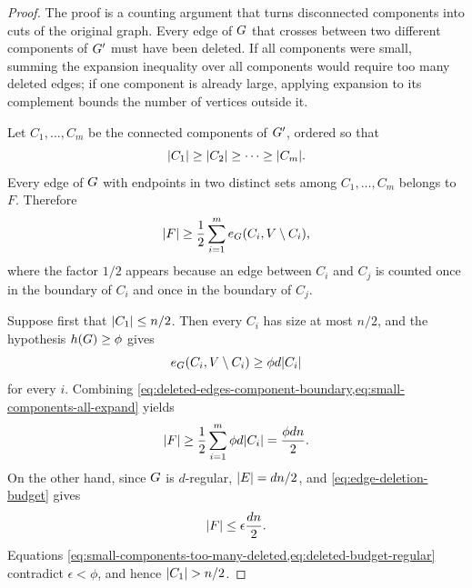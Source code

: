 \begin{proof}
	The proof is a counting argument that turns disconnected components into cuts of the original graph. Every edge of \(G\) that crosses between two different components of \(G'\) must have been deleted. If all components were small, summing the expansion inequality over all components would require too many deleted edges; if one component is already large, applying expansion to its complement bounds the number of vertices outside it.

	Let \(C_1,\ldots,C_m\) be the connected components of \(G'\), ordered so that
	\begin{equation}
		\label{eq:component-ordering}
		\lvert C_1\rvert\geq \lvert C_2\rvert\geq\cdots\geq \lvert C_m\rvert.
	\end{equation}
	Every edge of \(G\) with endpoints in two distinct sets among \(C_1,\ldots,C_m\) belongs to \(F\). Therefore
	\begin{equation}
		\label{eq:deleted-edges-component-boundary}
		\lvert F\rvert\geq \frac{1}{2}\sum_{i=1}^m e_{G}(C_i,V\setminus C_i),
	\end{equation}
	where the factor \(1/2\) appears because an edge between \(C_i\) and \(C_j\) is counted once in the boundary of \(C_i\) and once in the boundary of \(C_j\).

	Suppose first that \(\lvert C_1\rvert\leq n/2\). Then every \(C_i\) has size at most \(n/2\), and the hypothesis \(h(G)\geq\phi\) gives
	\begin{equation}
		\label{eq:small-components-all-expand}
		e_{G}(C_i,V\setminus C_i)\geq \phi d\lvert C_i\rvert
	\end{equation}
	for every \(i\). Combining \cref{eq:deleted-edges-component-boundary,eq:small-components-all-expand} yields
	\begin{equation}
		\label{eq:small-components-too-many-deleted}
		\lvert F\rvert\geq \frac{1}{2}\sum_{i=1}^m\phi d\lvert C_i\rvert=\frac{\phi d n}{2}.
	\end{equation}
	On the other hand, since \(G\) is \(d\)-regular, \(\lvert E\rvert=dn/2\), and \cref{eq:edge-deletion-budget} gives
	\begin{equation}
		\label{eq:deleted-budget-regular}
		\lvert F\rvert\leq \epsilon\frac{dn}{2}.
	\end{equation}
	Equations \cref{eq:small-components-too-many-deleted,eq:deleted-budget-regular} contradict \(\epsilon<\phi\), and hence \(\lvert C_1\rvert>n/2\).


\end{proof}
